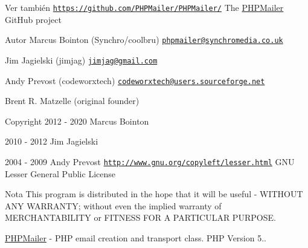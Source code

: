 \begin{DoxySeeAlso}{Ver también}
\href{https://github.com/PHPMailer/PHPMailer/}{\tt https\+://github.\+com/\+P\+H\+P\+Mailer/\+P\+H\+P\+Mailer/} The \hyperlink{classPHPMailer_1_1PHPMailer_1_1PHPMailer}{P\+H\+P\+Mailer} Git\+Hub project
\end{DoxySeeAlso}
\begin{DoxyAuthor}{Autor}
Marcus Bointon (Synchro/coolbru) \href{mailto:phpmailer@synchromedia.co.uk}{\tt phpmailer@synchromedia.\+co.\+uk} 

Jim Jagielski (jimjag) \href{mailto:jimjag@gmail.com}{\tt jimjag@gmail.\+com} 

Andy Prevost (codeworxtech) \href{mailto:codeworxtech@users.sourceforge.net}{\tt codeworxtech@users.\+sourceforge.\+net} 

Brent R. Matzelle (original founder) 
\end{DoxyAuthor}
\begin{DoxyCopyright}{Copyright}
2012 -\/ 2020 Marcus Bointon 

2010 -\/ 2012 Jim Jagielski 

2004 -\/ 2009 Andy Prevost  \href{http://www.gnu.org/copyleft/lesser.html}{\tt http\+://www.\+gnu.\+org/copyleft/lesser.\+html} G\+NU Lesser General Public License 
\end{DoxyCopyright}
\begin{DoxyNote}{Nota}
This program is distributed in the hope that it will be useful -\/ W\+I\+T\+H\+O\+UT A\+NY W\+A\+R\+R\+A\+N\+TY; without even the implied warranty of M\+E\+R\+C\+H\+A\+N\+T\+A\+B\+I\+L\+I\+TY or F\+I\+T\+N\+E\+SS F\+OR A P\+A\+R\+T\+I\+C\+U\+L\+AR P\+U\+R\+P\+O\+SE.
\end{DoxyNote}
\hyperlink{classPHPMailer_1_1PHPMailer_1_1PHPMailer}{P\+H\+P\+Mailer} -\/ P\+HP email creation and transport class. P\+HP Version 5..

